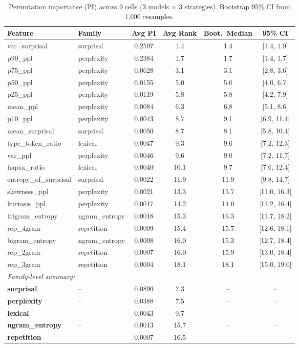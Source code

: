 \begin{table}[t]
\centering
\caption{Permutation importance (PI) across 9 cells (3 models $\times$ 3 strategies).
Bootstrap 95\% CI from 1{,}000 resamples.}
\label{tab:conditional_pi}
\small
\setlength{\tabcolsep}{3pt}
\begin{tabular}{llcccc}
\toprule
Feature & Family & Avg PI & Avg Rank & Boot.\ Median & 95\% CI \\
\midrule
  var\_surprisal & surprisal & 0.2597 & 1.4 & 1.4 & [1.4, 1.9] \\
  p90\_ppl & perplexity & 0.2384 & 1.7 & 1.7 & [1.4, 1.7] \\
  p75\_ppl & perplexity & 0.0628 & 3.1 & 3.1 & [2.8, 3.6] \\
  p50\_ppl & perplexity & 0.0155 & 5.0 & 5.0 & [4.0, 6.7] \\
  p25\_ppl & perplexity & 0.0119 & 5.8 & 5.8 & [4.2, 7.9] \\
  mean\_ppl & perplexity & 0.0084 & 6.3 & 6.8 & [5.1, 8.6] \\
  p10\_ppl & perplexity & 0.0043 & 8.7 & 9.1 & [6.9, 11.4] \\
  mean\_surprisal & surprisal & 0.0050 & 8.7 & 8.1 & [5.8, 10.4] \\
  type\_token\_ratio & lexical & 0.0047 & 9.3 & 9.6 & [7.2, 12.3] \\
  var\_ppl & perplexity & 0.0046 & 9.6 & 9.0 & [7.2, 11.7] \\
  hapax\_ratio & lexical & 0.0040 & 10.1 & 9.7 & [7.6, 12.4] \\
  entropy\_of\_surprisal & surprisal & 0.0022 & 11.9 & 11.9 & [9.8, 14.7] \\
  skewness\_ppl & perplexity & 0.0021 & 13.3 & 13.7 & [11.0, 16.3] \\
  kurtosis\_ppl & perplexity & 0.0017 & 14.2 & 14.0 & [11.2, 16.4] \\
  trigram\_entropy & ngram\_entropy & 0.0018 & 15.3 & 16.3 & [11.7, 18.2] \\
  rep\_4gram & repetition & 0.0009 & 15.4 & 15.7 & [12.6, 18.1] \\
  bigram\_entropy & ngram\_entropy & 0.0008 & 16.0 & 15.3 & [12.7, 18.4] \\
  rep\_2gram & repetition & 0.0007 & 16.0 & 15.9 & [13.0, 18.4] \\
  rep\_3gram & repetition & 0.0004 & 18.1 & 18.1 & [15.0, 19.0] \\
\midrule
\multicolumn{6}{l}{\textit{Family-level summary:}} \\
  \textbf{surprisal} & -- & 0.0890 & 7.3 & -- & -- \\
  \textbf{perplexity} & -- & 0.0388 & 7.5 & -- & -- \\
  \textbf{lexical} & -- & 0.0043 & 9.7 & -- & -- \\
  \textbf{ngram\_entropy} & -- & 0.0013 & 15.7 & -- & -- \\
  \textbf{repetition} & -- & 0.0007 & 16.5 & -- & -- \\
\bottomrule
\end{tabular}
\end{table}